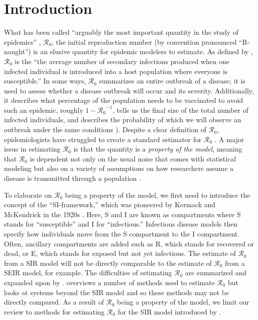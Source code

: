 \documentclass[12pt]{article}
\newcommand{\rr}{\ensuremath{\mathcal{R}_0}}
\begin{document}
\section{Introduction}\label{sec:intro}
What has been called ``arguably the most important quantity in the study of epidemics'' \citep{Heesterbeek2002},  $\mathcal{R}_0$, the initial reproduction number (by convention pronounced ``R-naught'') is an elusive quantity for epidemic modelers to estimate.  As defined by \citet{anderson1992}, $\rr$ is the ``the average number of secondary infections produced when one infected individual is introduced into a host population where everyone is susceptible.''  In some ways, $\rr$ summarizes an entire outbreak of a disease; it is used to assess whether a disease outbreak will occur and its severity.  Additionally, it describes what percentage of the population needs to be vaccinated to avoid such an epidemic, roughly $1-\rr^{-1}$, tells us the final size of the total number of infected individuals, and describes the probability of which we will observe an outbreak under the same conditions \citep{anderson1992,britton2010}).  Despite a clear definition of $\rr$, epidemiologists have struggled to create a standard  estimator for $\rr$  \citep{hethcote2000}.  A major issue in estimating $\rr$ is that the quantity is a \textit{property of the model}, meaning that $\rr$ is dependent not only on the usual noise that comes with statistical modeling but also on a variety of assumptions on how researchers assume a disease is transmitted through a population \citep{diekmann2009}.

To elaborate on $\rr$ being a property of the model, we first need to introduce the concept of the ``SI-framework,'' which was pioneered by Kermack and McKendrick in the 1920s \citep{getz2006}.   Here, S and I are known as compartments where S stands for ``susceptible'' and I for ``infectious.'' Infectious disease models then specify how individuals move from the S compartment to the I compartment.  Often, ancillary compartments are added such as R, which stands for recovered or dead, or E, which stands for exposed but not yet infectious.  The estimate of $\rr$ from a SIR model will not be directly comparable to the estimate of $\rr$ from a SEIR model, for example.  The difficulties of estimating $\rr$ are summarized and expanded upon by \cite{li2011}.  \cite{driessche2017} overviews a number of methods used to estimate $\rr$ but looks at systems beyond the SIR model and so these methods may not be directly compared.   As a result of $\rr$ being a property of the model, we limit our review to methods for estimating $\rr$ for the SIR model introduced by \cite{Kermack700}.
\end{document}
